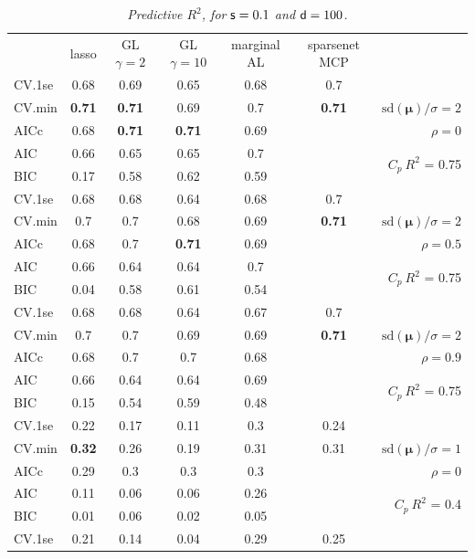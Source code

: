 \documentclass[12pt]{article}
\newcommand{\mr}[1]{\mathrm{#1}}
\newcommand{\bm}[1]{\mathbf{#1}}
\begin{document}
\begin{table}[p]\vspace{-.5cm}
\caption[l]{\it Predictive $R^2$, for ${\sf s}=0.1$ and  ${\sf d}=100$.}
\vspace{-.5cm}
\small{}
\begin{center}
\begin{tabular}{l*{5}{c}|r}
 & lasso & GL $\gamma=2$ & GL $\gamma=10$ & marginal AL & sparsenet MCP  &  \\
\cline{1-7}
CV.1se & 0.68 & 0.69 & 0.65 & 0.68 & 0.7 &\\
CV.min & {\bf 0.71} & {\bf 0.71} & 0.69 & 0.7 & {\bf 0.71} &  $\mr{sd}(\bm{\mu})/\sigma=2$ \\
AICc & 0.68 & {\bf 0.71} & {\bf 0.71} & 0.69 & & $\rho=0$ \\
AIC & 0.66 & 0.65 & 0.65 & 0.7 & & \multirow{2}{*}{$C_p ~ R^2$ = 0.75} \\
BIC & 0.17 & 0.58 & 0.62 & 0.59 & & \\
 \hline 
CV.1se & 0.68 & 0.68 & 0.64 & 0.68 & 0.7 &\\
CV.min & 0.7 & 0.7 & 0.68 & 0.69 & {\bf 0.71} &  $\mr{sd}(\bm{\mu})/\sigma=2$ \\
AICc & 0.68 & 0.7 & {\bf 0.71} & 0.69 & & $\rho=0.5$ \\
AIC & 0.66 & 0.64 & 0.64 & 0.7 & & \multirow{2}{*}{$C_p ~ R^2$ = 0.75} \\
BIC & 0.04 & 0.58 & 0.61 & 0.54 & & \\
 \hline 
CV.1se & 0.68 & 0.68 & 0.64 & 0.67 & 0.7 &\\
CV.min & 0.7 & 0.7 & 0.69 & 0.69 & {\bf 0.71} &  $\mr{sd}(\bm{\mu})/\sigma=2$ \\
AICc & 0.68 & 0.7 & 0.7 & 0.68 & & $\rho=0.9$ \\
AIC & 0.66 & 0.64 & 0.64 & 0.69 & & \multirow{2}{*}{$C_p ~ R^2$ = 0.75} \\
BIC & 0.15 & 0.54 & 0.59 & 0.48 & & \\
 \hline 
CV.1se & 0.22 & 0.17 & 0.11 & 0.3 & 0.24 &\\
CV.min & {\bf 0.32} & 0.26 & 0.19 & 0.31 & 0.31 &  $\mr{sd}(\bm{\mu})/\sigma=1$ \\
AICc & 0.29 & 0.3 & 0.3 & 0.3 & & $\rho=0$ \\
AIC & 0.11 & 0.06 & 0.06 & 0.26 & & \multirow{2}{*}{$C_p ~ R^2$ = 0.4} \\
BIC & 0.01 & 0.06 & 0.02 & 0.05 & & \\
 \hline 
CV.1se & 0.21 & 0.14 & 0.04 & 0.29 & 0.25 &\\

\end{tabular}
\end{center}
\end{table}
\end{document}
